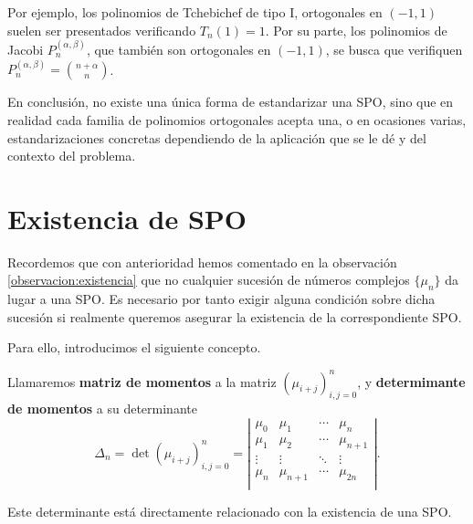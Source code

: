 Por ejemplo, los polinomios de Tchebichef de tipo I, ortogonales en $(-1,1)$ suelen ser presentados verificando $T_n(1)=1$. Por su parte, los polinomios de Jacobi $P_n^{(\alpha,\beta)}$, que también son ortogonales en $(-1,1)$, se busca que verifiquen $P_n^{(\alpha,\beta)}=\binom{n+\alpha}{n}$.

En conclusión, no existe una única forma de estandarizar una SPO, sino que en realidad cada familia de polinomios ortogonales acepta una, o en ocasiones varias, estandarizaciones concretas dependiendo de la aplicación que se le dé y del contexto del problema.

\section{Existencia de SPO}
\label{section:existencia-SPO}

Recordemos que con anterioridad hemos comentado en la observación \ref{observacion:existencia} que no cualquier sucesión de números complejos $\{\mu_n\}$ da lugar a una SPO. Es necesario por tanto exigir alguna condición sobre dicha sucesión si realmente queremos asegurar la existencia de la correspondiente SPO.

Para ello, introducimos el siguiente concepto.

\begin{definicion}
    Llamaremos \textbf{matriz de momentos} a la matriz $(\mu_{i+j})_{i,j=0}^n$, y \textbf{determimante de momentos} a su determinante
    \begin{equation}
        \label{eq:determinante}
        \Delta_n = \det(\mu_{i+j})_{i,j=0}^n = \left|\begin{array}{cccc}
            \mu_0 & \mu_1 & \cdots & \mu_n \\
            \mu_1 & \mu_2 & \cdots & \mu_{n+1} \\
            \vdots & \vdots & \ddots & \vdots \\
            \mu_n & \mu_{n+1} & \cdots & \mu_{2n} \\
        \end{array}\right|.
    \end{equation}
\end{definicion}

Este determinante está directamente relacionado con la existencia de una SPO.

